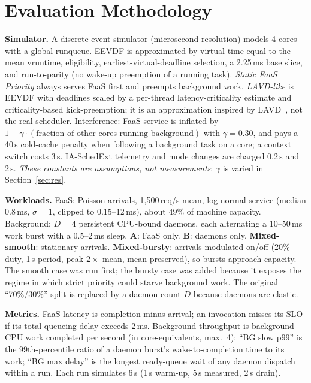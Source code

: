 \documentclass[journal]{IEEEtran}
\begin{document}
\section{Evaluation Methodology}\label{sec:eval}
\textbf{Simulator.} A discrete-event simulator (microsecond resolution) models 4 cores with a global runqueue. EEVDF is approximated by virtual time equal to the mean vruntime, eligibility, earliest-virtual-deadline selection, a 2.25\,ms base slice, and run-to-parity (no wake-up preemption of a running task). \emph{Static FaaS Priority} always serves FaaS first and preempts background work. \emph{LAVD-like} is EEVDF with deadlines scaled by a per-thread latency-criticality estimate and criticality-based kick-preemption; it is an approximation inspired by LAVD~\cite{lavd}, not the real scheduler. Interference: FaaS service is inflated by $1+\gamma\cdot(\text{fraction of other cores running background})$ with $\gamma=0.30$, and pays a 40\,\textmu s cold-cache penalty when following a background task on a core; a context switch costs 3\,\textmu s. IA-SchedExt telemetry and mode changes are charged 0.2\,\textmu s and 2\,\textmu s. \emph{These constants are assumptions, not measurements}; $\gamma$ is varied in Section~\ref{sec:res}.

\textbf{Workloads.} FaaS: Poisson arrivals, 1{,}500\,req/s mean, log-normal service (median 0.8\,ms, $\sigma{=}1$, clipped to 0.15--12\,ms), about 49\% of machine capacity. Background: $D=4$ persistent CPU-bound daemons, each alternating a 10--50\,ms work burst with a 0.5--2\,ms sleep. \textbf{A}: FaaS only. \textbf{B}: daemons only. \textbf{Mixed-smooth}: stationary arrivals. \textbf{Mixed-bursty}: arrivals modulated on/off (20\% duty, 1\,s period, peak $2\times$ mean, mean preserved), so bursts approach capacity. The smooth case was run first; the bursty case was added because it exposes the regime in which strict priority could starve background work. The original ``70\%/30\%'' split is replaced by a daemon count $D$ because daemons are elastic.

\textbf{Metrics.} FaaS latency is completion minus arrival; an invocation misses its SLO if its total queueing delay exceeds 2\,ms. Background throughput is background CPU work completed per second (in core-equivalents, max.\ 4); ``BG slow p99'' is the 99th-percentile ratio of a daemon burst's wake-to-completion time to its work; ``BG max delay'' is the longest ready-queue wait of any daemon dispatch within a run. Each run simulates 6\,s (1\,s warm-up, 5\,s measured, 2\,s drain).
\end{document}
